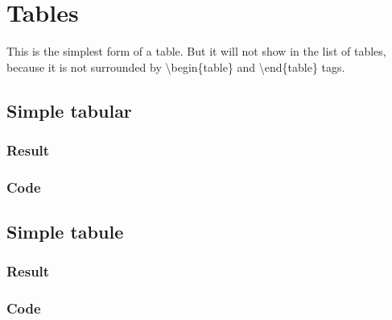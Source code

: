 \renewcommand\example[2]{\subsection{#1}\subsubsection{Result}\subsubsection{Code}}
\section{Tables}
This is the simplest form of a table. But it will not show in the list of tables, because it is not surrounded by \textbackslash begin\{table\} and \textbackslash end\{table\} tags.
\example{Simple tabular}{simpletabular.tex}
\example{Simple tabule}{simpletable.tex}

